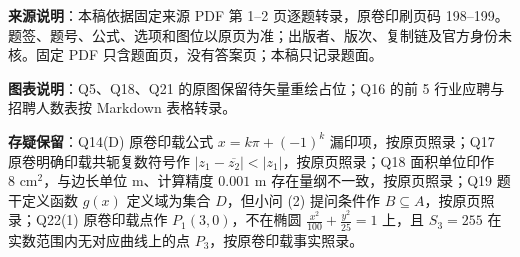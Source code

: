 


\begin{gktip}
\textbf{来源说明}：本稿依据固定来源 PDF 第 1–2 页逐题转录，原卷印刷页码 198–199。题签、题号、公式、选项和图位以原页为准；出版者、版次、复制链及官方身份未核。固定 PDF 只含题面页，没有答案页；本稿只记录题面。

\textbf{图表说明}：Q5、Q18、Q21 的原图保留待矢量重绘占位；Q16 的前 5 行业应聘与招聘人数表按 Markdown 表格转录。

\textbf{存疑保留}：Q14(D) 原卷印载公式 $x = k\pi + (-1)^k$ 漏印项，按原页照录；Q17 原卷明确印载共轭复数符号作 $|z_1 - \overline{z_2}| < |z_1|$，按原页照录；Q18 面积单位印作 $8\text{ cm}^2$，与边长单位 $\mathrm{m}$、计算精度 $0.001\text{ m}$ 存在量纲不一致，按原页照录；Q19 题干定义函数 $g(x)$ 定义域为集合 $D$，但小问 (2) 提问条件作 $B \subseteq A$，按原页照录；Q22(1) 原卷印载点作 $P_1(3, 0)$，不在椭圆 $\frac{x^2}{100} + \frac{y^2}{25} = 1$ 上，且 $S_3 = 255$ 在实数范围内无对应曲线上的点 $P_3$，按原卷印载事实照录。
\end{gktip}


